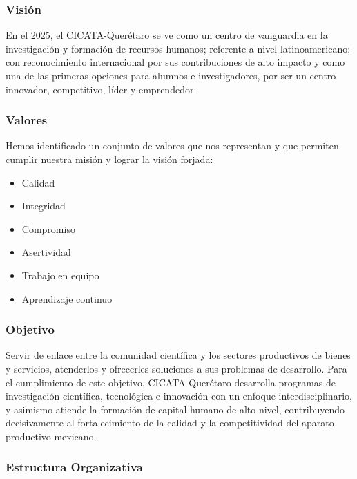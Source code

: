 \documentclass[12pt]{book} %
\begin{document}
		\subsubsection{Visión}
			En el 2025, el CICATA-Querétaro se ve como un centro de vanguardia en la investigación y formación de 
			recursos humanos; referente a nivel latinoamericano; con reconocimiento internacional por sus contribuciones
			de alto impacto y como una de las primeras opciones para alumnos e investigadores, por ser un centro
			innovador, competitivo, líder y emprendedor.
		
		\subsubsection{Valores}
			Hemos identificado un conjunto de valores que nos representan y que permiten cumplir nuestra misión y lograr
			la visión forjada:\\
			\begin{multicols}{2}
				\begin{itemize}
					\item Calidad
					\item Integridad
					\item Compromiso
					\item Asertividad
					\item Trabajo en equipo
					\item Aprendizaje continuo
				\end{itemize}
			\end{multicols}
		
		\subsubsection{Objetivo}
			Servir de enlace entre la comunidad científica y los sectores productivos de bienes y servicios, atenderlos
			y ofrecerles soluciones a sus problemas de desarrollo. Para el cumplimiento de este objetivo, CICATA
			Querétaro desarrolla programas de investigación científica, tecnológica e innovación con un enfoque
			interdisciplinario, y asimismo atiende la formación de capital humano de alto nivel, contribuyendo
 			decisivamente al fortalecimiento de la calidad y la competitividad del aparato productivo mexicano.
 		
 		\subsubsection{Estructura Organizativa}
			 
\end{document}
